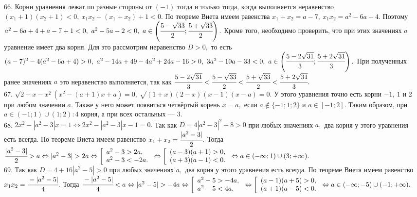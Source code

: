 66. Корни уравнения лежат по разные стороны от $(-1)$ тогда и только тогда, когда выполняется неравенство $(x_1+1)(x_2+1)<0,\ x_1x_2+(x_1+x_2)+1<0.$ По теореме Виета имеем равенства $x_1+x_2=a-7,\ x_1x_2=a^2-6a+4.$ Поэтому $a^2-6a+4+a-7+1<0,\ a^2-5a-2<0,\ a\in\left(\cfrac{5-\sqrt{33}}{2};\cfrac{5+\sqrt{33}}{2}\right).$ Кроме того, необходимо проверить, что при этих значениях $a$ уравнение имеет два корня. Для это рассмотрим неравенство $D>0,$ то есть $(a-7)^2-4(a^2-6a+4)>0,\ a^2-14a+49-4a^2+24a-16>0,\ 3a^2-10a-33<0,\ a\in\left(\cfrac{5-2\sqrt{31}}{3};\cfrac{5+2\sqrt{31}}{3}\right).$ При полученных ранее значениях $a$ это неравенство выполняется, так как $\cfrac{5-2\sqrt{31}}{3}<\cfrac{5-\sqrt{33}}{2}<\cfrac{5+\sqrt{33}}{2}<\cfrac{5+2\sqrt{31}}{3}.$\\
67. $\sqrt{2+x-x^2}(x^2-(a+1)x+a)=0,\ \sqrt{(1+x)(2-x)}(x-1)(x-a)=0.$ У этого уравнения точно есть корни $-1,\ 1$ и 2 при любом значении $a.$ Также у него
может появиться четвёртый корень $x=a,$ если $a\notin\{-1;1;2\}$ и $a\in[-1;2].$ Таким образом, при $a\in(-1;1)\cup(1;2): 4$ корня, а при всех остальных --- 3.\\
68. $2x^2-|a^2-3|x=1\Leftrightarrow 2x^2-|a^2-3|x-1=0.$ Так как $D=4|a^2-3|^2+8>0$ при любых значениях $a,$ два корня у этого уравнения есть всегда. По теореме Виета имеем равенство $x_1+x_2=\cfrac{|a^2-3|}{2}.$ Тогда $\cfrac{|a^2-3|}{2}>a\Leftrightarrow |a^2-3|>2a \Leftrightarrow \left[\begin{array}{l} a^2-3>2a,\\ a^2-3<-2a.\end{array}\right.\Leftrightarrow \left[\begin{array}{l} (a-3)(a+1)>0,\\ (a+3)(a-1)<0.\end{array}\right.\Leftrightarrow a\in(-\infty;1)\cup(3;+\infty).$\\
69. Так как $D=4+16|a^2-5|>0$ при любых значениях $a,$ два корня у этого уравнения есть всегда. По теореме Виета имеем равенство $x_1x_2=\cfrac{-|a^2-5|}{4}.$ Тогда $\cfrac{-|a^2-5|}{4}<a\Leftrightarrow |a^2-5|>-4a \Leftrightarrow \left[\begin{array}{l} a^2-5>-4a,\\ a^2-5<4a.\end{array}\right.\Leftrightarrow \left[\begin{array}{l} (a-1)(a+5)>0,\\ (a+1)(a-5)<0.\end{array}\right.\Leftrightarrow a\in(-\infty;-5)\cup(-1;+\infty).$\\
